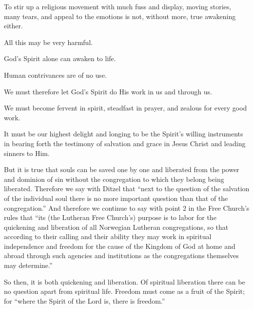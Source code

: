 To stir up a religious movement with much fuss and display, moving stories, many tears, and appeal to the emotions is not, without more, true awakening either.

All this may be very harmful.

God’s Spirit alone can awaken to life.

Human contrivances are of no use.

We must therefore let God’s Spirit do His work in us and through us.

We must become fervent in spirit, steadfast in prayer, and zealous for every good work.

It must be our highest delight and longing to be the Spirit’s willing instruments in bearing forth the testimony of salvation and grace in Jesus Christ and leading sinners to Him.

But it is true that souls can be saved one by one and liberated from the power and dominion of sin without the congregation to which they belong being liberated. Therefore we say with Ditzel that “next to the question of the salvation of the individual soul there is no more important question than that of the congregation.” And therefore we continue to say with point 2 in the Free Church’s rules that “its (the Lutheran Free Church’s) purpose is to labor for the quickening and liberation of all Norwegian Lutheran congregations, so that according to their calling and their ability they may work in spiritual independence and freedom for the cause of the Kingdom of God at home and abroad through such agencies and institutions as the congregations themselves may determine.”

So then, it is both quickening and liberation. Of spiritual liberation there can be no question apart from spiritual life. Freedom must come as a fruit of the Spirit; for “where the Spirit of the Lord is, there is freedom.”
